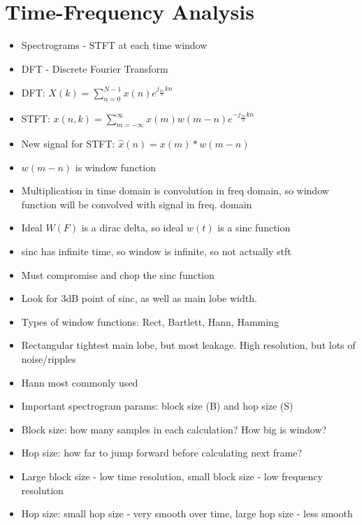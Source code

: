 \documentclass[12pt, letter]{article}
\begin{document}
\section{Time-Frequency Analysis}%
\begin{itemize}
	\item Spectrograms - STFT at each time window
	\item DFT - Discrete Fourier Transform
	\item DFT: $X(k) = \sum_{n=0}^{N-1} x(n)e^{j_\frac{2\pi}{N}kn}$
	\item STFT: $x(n,k) = \sum_{m=-\infty}^{\infty} x(m)w(m-n)e^{-j_\frac{2\pi}{N}kn}$
	\item New signal for STFT: $\hat{x}(n) = x(m)*w(m-n)$
	\item $w(m-n)$ is window function
	\item Multiplication in time domain is convolution in freq domain, so window function will be convolved with signal in freq. domain
	\item Ideal $W(F)$ is a dirac delta, so ideal  $w(t)$ is a sinc function
	\item sinc has infinite time, so window is infinite, so not actually stft
	\item Must compromise and chop the sinc function
	\item Look for 3dB point of sinc, as well as main lobe width.
	\item Types of window functions: Rect, Bartlett, Hann, Hamming
	\item Rectangular tightest main lobe, but most leakage. High resolution, but lots of noise/ripples
	\item Hann most commonly used
	\item Important spectrogram params: block size (B) and hop size (S)
	\item Block size: how many samples in each calculation? How big is window?
	\item Hop size: how far to jump forward before calculating next frame?
	\item Large block size - low time resolution, small block size - low frequency resolution
	\item Hop size: small hop size - very smooth over time, large hop size - less smooth
\end{itemize}
\end{document}
